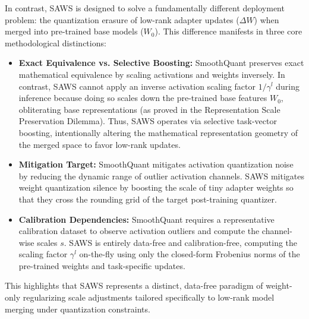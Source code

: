In contrast, SAWS is designed to solve a fundamentally different deployment problem: the quantization erasure of low-rank adapter updates ($\Delta W$) when merged into pre-trained base models ($W_0$). This difference manifests in three core methodological distinctions:
\begin{itemize}
  \item \textbf{Exact Equivalence vs. Selective Boosting:} SmoothQuant preserves exact mathematical equivalence by scaling activations and weights inversely. In contrast, SAWS cannot apply an inverse activation scaling factor $1/\gamma^l$ during inference because doing so scales down the pre-trained base features $W_0$, obliterating base representations (as proved in the Representation Scale Preservation Dilemma). Thus, SAWS operates via selective task-vector boosting, intentionally altering the mathematical representation geometry of the merged space to favor low-rank updates.
  \item \textbf{Mitigation Target:} SmoothQuant mitigates activation quantization noise by reducing the dynamic range of outlier activation channels. SAWS mitigates weight quantization silence by boosting the scale of tiny adapter weights so that they cross the rounding grid of the target post-training quantizer.
  \item \textbf{Calibration Dependencies:} SmoothQuant requires a representative calibration dataset to observe activation outliers and compute the channel-wise scales $s$. SAWS is entirely data-free and calibration-free, computing the scaling factor $\gamma^l$ on-the-fly using only the closed-form Frobenius norms of the pre-trained weights and task-specific updates.
\end{itemize}
This highlights that SAWS represents a distinct, data-free paradigm of weight-only regularizing scale adjustments tailored specifically to low-rank model merging under quantization constraints.


